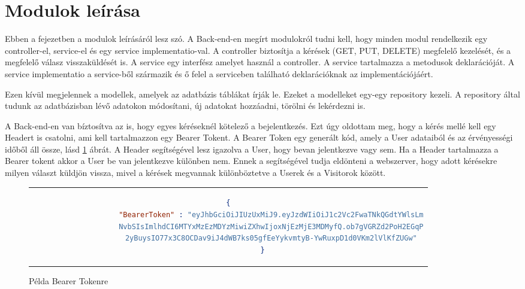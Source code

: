 \section{Modulok leírása}

Ebben a fejezetben a modulok leírásáról lesz szó. A Back-end-en megírt modulokról tudni kell, hogy minden modul rendelkezik egy controller-el, service-el és egy service implementatio-val. A controller biztosítja a kérések (GET, PUT, DELETE) megfelelő kezelését, és a megfelelő válasz visszaküldését is. A service egy interfész amelyet használ a controller. A service tartalmazza a metodusok deklarációját. A service implementatio a service-ből származik és ő felel a serviceben található deklarációknak az implementációjáért. 

Ezen kívül megjelennek a modellek, amelyek az adatbázis táblákat írják le. Ezeket a modelleket egy-egy repository kezeli. A repository által tudunk az adatbázisban lévő adatokon módosítani, új adatokat hozzáadni, törölni és lekérdezni is. 

A Back-end-en van bíztosítva az is, hogy egyes kéréseknél kötelező a bejelentkezés. Ezt úgy oldottam meg, hogy a kérés mellé kell egy Headert is csatolni, ami kell tartalmazzon egy Bearer Tokent. A Bearer Token egy generált kód, amely a User adataiból és az érvényességi időből áll össze, lásd \ref{btokenJSON} ábrát. A Header segítségével lesz igazolva a User, hogy bevan jelentkezve vagy sem. Ha a Header tartalmazza a Bearer tokent akkor a User be van jelentkezve különben nem. Ennek a segítségével tudja eldönteni a webszerver, hogy adott kérésekre milyen választ küldjön vissza, mivel a kérések megvannak különböztetve a Userek és a Visitorok között.

	\begin{figure}[thp]
		\centering         
		\caption{Példa Bearer Tokenre}
		\label{btokenJSON}
		\begin{tabular}{c} 
			\begin{lstlisting}[language=JSON]
				{
					"BearerToken" : "eyJhbGciOiJIUzUxMiJ9.eyJzdWIiOiJ1c2Vc2FwaTNkQGdtYWlsLm
					NvbSIsImlhdCI6MTYxMzEzMDYzMiwiZXhwIjoxNjEzMjE3MDMyfQ.ob7gVGRZd2PoH2EGqP
					2yBuysIO77x3C8OCDav9iJ4dWB7ks05gfEeYykvmtyB-YwRuxpD1d0VKm2lVlKfZUGw"
				}
			\end{lstlisting}
		\end{tabular}
	\end{figure}

